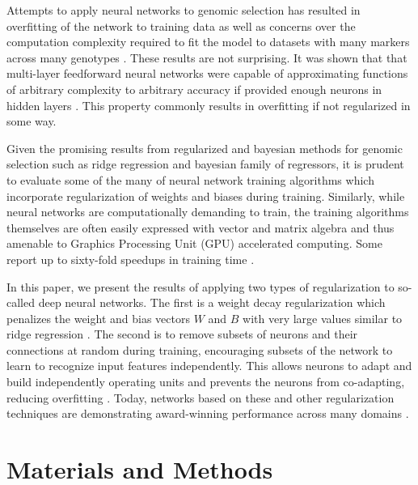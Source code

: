\documentclass[9pt,twocolumn,twoside]{g3_article/gsag3jnl}
\begin{document}
Attempts to apply neural networks to genomic selection has resulted in overfitting of the 
network to training data as well as concerns over the 
computation complexity required to fit the model to datasets with many
markers across many genotypes \citep{heslot2012, gonzalez-recio2014}. 
These results are not surprising. It was shown that that multi-layer 
feedforward neural networks were capable of approximating functions of 
arbitrary complexity to arbitrary accuracy if provided enough neurons 
in hidden layers \citep{hornik1989}. This property commonly
results in overfitting if not regularized in some way. 

Given the promising results from regularized and bayesian methods for 
genomic selection such as ridge regression and bayesian family of regressors,
it is prudent to evaluate some of the many of neural network training algorithms which
incorporate regularization of weights and biases during training. Similarly, while
neural networks are computationally demanding to train, the training algorithms 
themselves are often easily expressed with vector and matrix algebra and thus amenable to
Graphics Processing Unit (GPU) accelerated computing. Some report up to sixty-fold speedups 
in training time \citep{sierra2010, schmidhuber2015}. 

In this paper, we present the results of applying two types of regularization
to so-called deep neural networks. The first is a weight decay regularization
which penalizes the weight and bias vectors $W$ and $B$ with very large values 
similar to ridge regression \citep{krogh1992}. The second is to remove subsets of neurons
and their connections at random during training, encouraging subsets of
the network to learn to recognize input features independently. This allows 
neurons to adapt and build independently operating units and prevents the 
neurons from co-adapting, reducing overfitting \citep{srivastava2014}.  
Today, networks based on these and other regularization techniques are
demonstrating award-winning performance across many domains \citep{schmidhuber2015}.


\section*{Materials and Methods}
\end{document}
